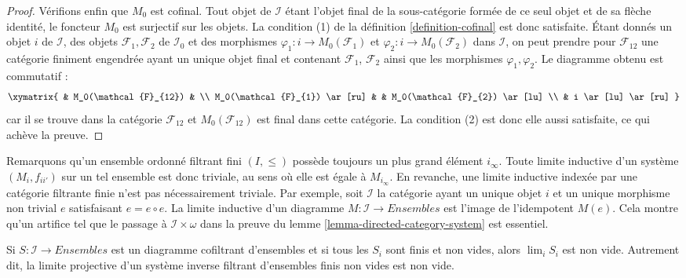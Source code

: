 \begin{proof}
\medskip\noindent
Vérifions enfin que $M_0$ est cofinal. Tout objet de $\mathcal{I}$ étant
l'objet final de la sous-catégorie formée de ce seul objet et de sa flèche
identité, le foncteur $M_0$ est surjectif sur les objets. La condition (1) de
la définition \ref{definition-cofinal} est donc satisfaite. Étant donnés un
objet $i$ de $\mathcal{I}$, des objets $\mathcal{F}_1, \mathcal{F}_2$ de
$\mathcal{I}_0$ et des morphismes
$\varphi_1 : i \to M_0(\mathcal{F}_1)$ et
$\varphi_2 : i \to M_0(\mathcal{F}_2)$ dans $\mathcal{I}$, on peut prendre
pour $\mathcal{F}_{12}$ une catégorie finiment engendrée ayant un unique
objet final et contenant $\mathcal{F}_1$, $\mathcal{F}_2$ ainsi que les
morphismes $\varphi_1, \varphi_2$. Le diagramme obtenu est commutatif :
$$
\xymatrix{
& M_0(\mathcal{F}_{12}) & \\
M_0(\mathcal{F}_{1}) \ar[ru] & & M_0(\mathcal{F}_{2}) \ar[lu] \\
& i \ar[lu] \ar[ru]
}
$$
car il se trouve dans la catégorie $\mathcal{F}_{12}$ et
$M_0(\mathcal{F}_{12})$ est final dans cette catégorie. La condition (2) est
donc elle aussi satisfaite, ce qui achève la preuve.
\end{proof}

\begin{remark}
\label{remark-trick-needed}
Remarquons qu'un ensemble ordonné filtrant fini $(I, \leq)$ possède toujours
un plus grand élément $i_\infty$. Toute limite inductive d'un système
$(M_i, f_{ii'})$ sur un tel ensemble est donc triviale, au sens où elle est
égale à $M_{i_\infty}$. En revanche, une limite inductive indexée par une
catégorie filtrante finie n'est pas nécessairement triviale. Par exemple,
soit $\mathcal{I}$ la catégorie ayant un unique objet $i$ et un unique
morphisme non trivial $e$ satisfaisant $e = e \circ e$. La limite inductive
d'un diagramme $M : \mathcal{I} \to Ensembles$ est l'image de l'idempotent $M(e)$.
Cela montre qu'un artifice tel que le passage à
$\mathcal{I}\times \omega$ dans la preuve du
lemme \ref{lemma-directed-category-system} est essentiel.
\end{remark}

\begin{lemma}
\label{lemma-nonempty-limit}
Si $S : \mathcal{I} \to \textit{Ensembles}$ est un diagramme cofiltrant
d'ensembles et si tous les $S_i$ sont finis et non vides, alors
$\lim_i S_i$ est non vide. Autrement dit, la limite projective d'un système
inverse filtrant d'ensembles finis non vides est non vide.
\end{lemma}

